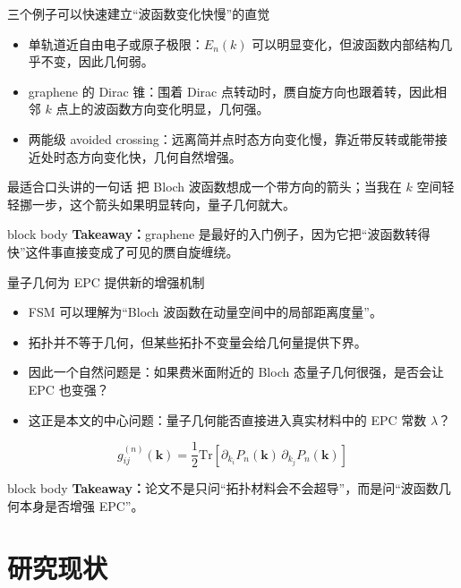 \documentclass[aspectratio=169,11pt,UTF8]{ctexbeamer}
\newcommand{\takeaway}[1]{%
  \vfill
  \begin{beamercolorbox}[wd=\textwidth,sep=0.7ex,rounded=true]{block body}
    \small\textbf{Takeaway：}#1
  \end{beamercolorbox}
}
\begin{document}
\begin{frame}{三个例子可以快速建立“波函数变化快慢”的直觉}
  \begin{itemize}
    \item 单轨道近自由电子或原子极限：$E_n(k)$ 可以明显变化，但波函数内部结构几乎不变，因此几何弱。
    \item graphene 的 Dirac 锥：围着 Dirac 点转动时，赝自旋方向也跟着转，因此相邻 $k$ 点上的波函数方向变化明显，几何强。
    \item 两能级 avoided crossing：远离简并点时态方向变化慢，靠近带反转或能带接近处时态方向变化快，几何自然增强。
  \end{itemize}
  \begin{block}{最适合口头讲的一句话}
    把 Bloch 波函数想成一个带方向的箭头；当我在 $k$ 空间轻轻挪一步，这个箭头如果明显转向，量子几何就大。
  \end{block}
  \takeaway{graphene 是最好的入门例子，因为它把“波函数转得快”这件事直接变成了可见的赝自旋缠绕。}
\end{frame}

\begin{frame}{量子几何为 EPC 提供新的增强机制}
  \begin{itemize}
    \item FSM 可以理解为“Bloch 波函数在动量空间中的局部距离度量”。
    \item 拓扑并不等于几何，但某些拓扑不变量会给几何量提供下界。
    \item 因此一个自然问题是：如果费米面附近的 Bloch 态量子几何很强，是否会让 EPC 也变强？
    \item 这正是本文的中心问题：\alert{量子几何能否直接进入真实材料中的 EPC 常数 $\lambda$？}
  \end{itemize}
  \begin{equation*}
    g_{ij}^{(n)}(\mathbf{k}) = \frac{1}{2}\mathrm{Tr}\left[\partial_{k_i} P_n(\mathbf{k}) \, \partial_{k_j} P_n(\mathbf{k})\right]
  \end{equation*}
  \takeaway{论文不是只问“拓扑材料会不会超导”，而是问“波函数几何本身是否增强 EPC”。}
\end{frame}

\section{研究现状}
\end{document}
